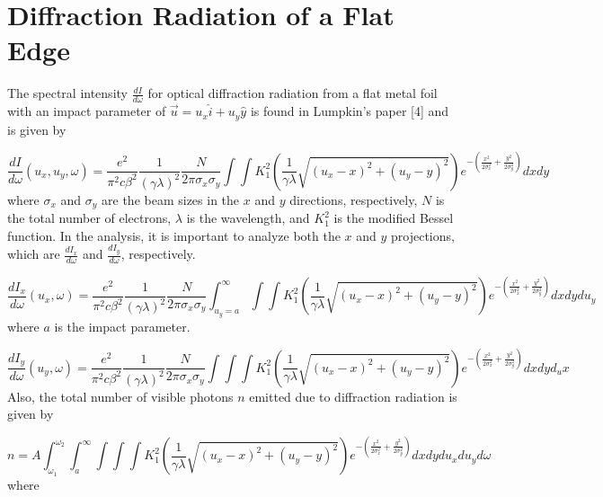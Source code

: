 \documentclass[12pt]{article}
\begin{document}
\section{Diffraction Radiation of a Flat Edge}

The spectral intensity $\frac{dI}{d \omega}$ for optical diffraction radiation from a flat metal foil with an impact parameter of $\vec{u}=u_x \hat{i}+u_y \hat{y}$ is found in Lumpkin's paper [4] and is given by

\begin{equation}
\frac{dI}{d \omega}(u_x,u_y,\omega)=\frac{e^2}{\pi^2 c \beta^2} \frac{1}{(\gamma \lambda)^2} \frac{N}{2 \pi \sigma_x \sigma_y} \int \int K_{1}^{2} \left( \frac{1}{\gamma \lambda} \sqrt{(u_x-x)^2+(u_y-y)^2} \right) e^{- \left( \frac{x^2}{2 \sigma_{x}^{2}}+\frac{y^2}{2 \sigma_{y}^{2}} \right) } dx dy
\end{equation}
where $\sigma_x$ and $\sigma_y$ are the beam sizes in the $x$ and $y$ directions, respectively, $N$ is the total number of electrons, $\lambda$ is the wavelength, and $K_1^{2}$ is the modified Bessel function. In the analysis, it is important to analyze both the $x$ and $y$ projections, which are $\frac{dI_x}{d \omega}$ and $\frac{dI_y}{d \omega}$, respectively.

\begin{equation}
\frac{dI_x}{d \omega}(u_x, \omega)=\frac{e^2}{\pi^2 c \beta^2} \frac{1}{(\gamma \lambda)^2} \frac{N}{2 \pi \sigma_x \sigma_y} \int_{u_y=a}^{\infty} \int \int K_{1}^{2} \left( \frac{1}{\gamma \lambda} \sqrt{(u_x-x)^2+(u_y-y)^2} \right) e^{- \left( \frac{x^2}{2 \sigma_{x}^{2}}+\frac{y^2}{2 \sigma_{y}^{2}} \right) } dx dy du_y
\end{equation}
where $a$ is the impact parameter.

\begin{equation}
\frac{dI_y}{d \omega}(u_y,\omega)=\frac{e^2}{\pi^2 c \beta^2} \frac{1}{(\gamma \lambda)^2} \frac{N}{2 \pi \sigma_x \sigma_y} \int \int \int K_{1}^{2} \left( \frac{1}{\gamma \lambda} \sqrt{(u_x-x)^2+(u_y-y)^2} \right) e^{- \left( \frac{x^2}{2 \sigma_{x}^{2}}+\frac{y^2}{2 \sigma_{y}^{2}} \right) } dx dy d_ux
\end{equation}
Also, the total number of visible photons $n$ emitted due to diffraction radiation is given by

\begin{equation}
n=A \int_{\omega_1}^{\omega_2} \int_{a}^{\infty} \int \int \int K_{1}^{2} \left( \frac{1}{\gamma \lambda} \sqrt{(u_x-x)^2+(u_y-y)^2} \right) e^{- \left( \frac{x^2}{2 \sigma_{x}^{2}}+\frac{y^2}{2 \sigma_{y}^{2}} \right) } dx dy du_x du_y d \omega
\end{equation}
where
\end{document}
